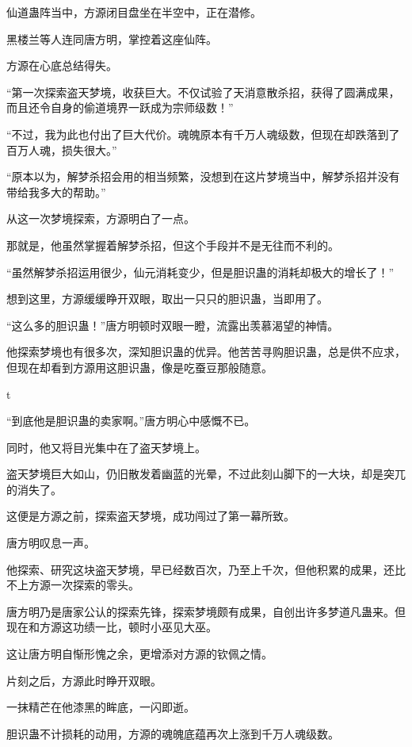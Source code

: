 
\begin{this_body}

仙道蛊阵当中，方源闭目盘坐在半空中，正在潜修。

黑楼兰等人连同唐方明，掌控着这座仙阵。

方源在心底总结得失。

“第一次探索盗天梦境，收获巨大。不仅试验了天消意散杀招，获得了圆满成果，而且还令自身的偷道境界一跃成为宗师级数！”

“不过，我为此也付出了巨大代价。魂魄原本有千万人魂级数，但现在却跌落到了百万人魂，损失很大。”

“原本以为，解梦杀招会用的相当频繁，没想到在这片梦境当中，解梦杀招并没有带给我多大的帮助。”

从这一次梦境探索，方源明白了一点。

那就是，他虽然掌握着解梦杀招，但这个手段并不是无往而不利的。

“虽然解梦杀招运用很少，仙元消耗变少，但是胆识蛊的消耗却极大的增长了！”

想到这里，方源缓缓睁开双眼，取出一只只的胆识蛊，当即用了。

“这么多的胆识蛊！”唐方明顿时双眼一瞪，流露出羡慕渴望的神情。

他探索梦境也有很多次，深知胆识蛊的优异。他苦苦寻购胆识蛊，总是供不应求，但现在却看到方源用这胆识蛊，像是吃蚕豆那般随意。

t

“到底他是胆识蛊的卖家啊。”唐方明心中感慨不已。

同时，他又将目光集中在了盗天梦境上。

盗天梦境巨大如山，仍旧散发着幽蓝的光晕，不过此刻山脚下的一大块，却是突兀的消失了。

这便是方源之前，探索盗天梦境，成功闯过了第一幕所致。

唐方明叹息一声。

他探索、研究这块盗天梦境，早已经数百次，乃至上千次，但他积累的成果，还比不上方源一次探索的零头。

唐方明乃是唐家公认的探索先锋，探索梦境颇有成果，自创出许多梦道凡蛊来。但现在和方源这功绩一比，顿时小巫见大巫。

这让唐方明自惭形愧之余，更增添对方源的钦佩之情。

片刻之后，方源此时睁开双眼。

一抹精芒在他漆黑的眸底，一闪即逝。

胆识蛊不计损耗的动用，方源的魂魄底蕴再次上涨到千万人魂级数。


\end{this_body}
